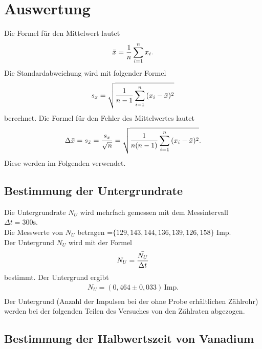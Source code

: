 \section{Auswertung}

Die Formel für den Mittelwert lautet
 \begin{equation}
    \bar{x}=\frac{1}{n}\sum_{i=1}^n x_i.\\
\end{equation}
Die Standardabweichung wird mit folgender Formel
\begin{equation}
    s_x=\sqrt{\frac{1}{n-1}\sum_{i=1}^n {(x_i-\bar{x})^2 }}\\
\end{equation}
berechnet.
Die Formel für den Fehler des Mittelwertes lautet
\begin{equation}
    \Delta \bar{x} = s_{\bar{x}}=\frac{s_x}{\sqrt{n}}= \sqrt{\frac{1}{n(n-1)}\sum_{i=1}^n {(x_i-\bar{x})^2 }}.\\
\end{equation}
Diese werden im Folgenden verwendet.

\subsection{Bestimmung der Untergrundrate}
Die Untergrundrate $N_U$ wird mehrfach gemessen mit dem Messintervall $ \Delta t=300 \text{s}$.\\
Die Messwerte von $N_U$ betragen =$\{129, 143, 144, 136, 139, 126, 158\}$ Imp.\\
Der Untergrund $N_U$ wird mit der Formel
\begin{equation}
  N_U = \frac{\bar{{N_U}}}{\Delta t} \\
 \end{equation}
 bestimmt.
Der Untergrund ergibt 
\begin{align*}
  N_U= ( 0,464 \pm 0,033) \, \mathrm{Imp}.\\
\end{align*}
\noindent
Der Untergrund (Anzahl der Impulsen bei der ohne Probe erhältlichen Zählrohr) werden bei der folgenden Teilen des Versuches von den Zählraten abgezogen.
\newpage
\subsection{Bestimmung der Halbwertszeit von Vanadium}

